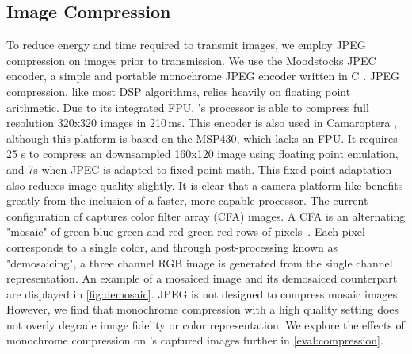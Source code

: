 
\subsection{Image Compression}
To reduce energy and time required to transmit images, we employ JPEG compression on images prior to transmission. We use the Moodstocks JPEC encoder, a simple and portable monochrome JPEG encoder written in C \cite{moodstocks}. JPEG compression, like most DSP algorithms, relies heavily on floating point arithmetic. Due to its integrated FPU, \name{}'s processor is able to compress full resolution 320x320 images in 210\,ms.
This encoder is also used in Camaroptera \cite{nardello2019camaroptera}, although this platform is based on the MSP430, which lacks an FPU. It requires 25 s to compress an downsampled 160x120 image using floating point emulation, and 7s when JPEC is adapted to fixed point math. This fixed point adaptation also reduces image quality slightly. It is clear that a camera platform like \name{} benefits greatly from the inclusion of a faster, more capable processor.
The current configuration of \name captures color filter array (CFA) images. A CFA is an alternating "mosaic" of green-blue-green and red-green-red rows of pixels~\cite{bayer1976color}. Each pixel corresponds to a single color, and through post-processing known as "demosaicing", a three channel RGB image is generated from the single channel representation. An example of a mosaiced image and its demosaiced counterpart are displayed in \cref{fig:demosaic}.
JPEG is not designed to compress mosaic images. However, we find that monochrome compression with a high quality setting does not overly degrade image fidelity or color representation. We explore the effects of monochrome compression on \name's captured images further in \cref{eval:compression}.


